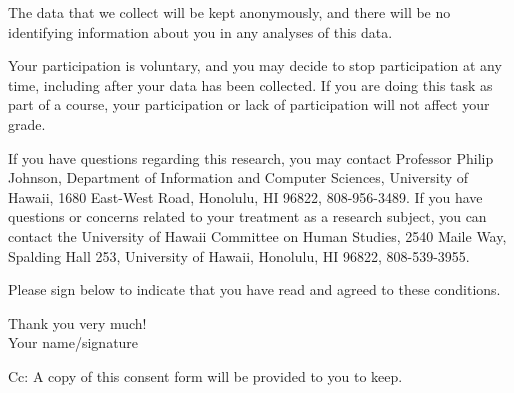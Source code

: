 The data that we collect will be kept anonymously, and there will be no identifying information about you in any analyses of this data. 

Your participation is voluntary, and you may decide to stop participation at any time, including after your data has been collected. If you are doing this task as part of a course, your participation or lack of participation will not affect your grade.

If you have questions regarding this research, you may contact Professor Philip Johnson, Department of Information and Computer Sciences, University of Hawaii, 1680 East-West Road, Honolulu, HI 96822, 808-956-3489.  If you have questions or concerns related to your treatment as a research subject, you can contact the University of Hawaii Committee on Human Studies, 2540 Maile Way, Spalding Hall 253, University of Hawaii, Honolulu, HI 96822, 
808-539-3955.

Please sign below to indicate that you have read and agreed to these conditions. 


Thank you very much! \\[2.0cm]


Your name/signature

Cc: A copy of this consent form will be provided to you to keep. 
